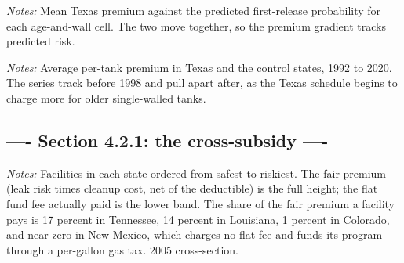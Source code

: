 \documentclass[
  12pt,
]{article}
\begin{document}
\clearpage
\null\vfill
\begin{center}
\label{fig-actuarial-alignment}
\par\vspace{8pt}
\par\vspace{8pt}
\begin{minipage}{0.85\textwidth}\small\textit{Notes:} Mean Texas premium against the predicted first-release probability for each age-and-wall cell. The two move together, so the premium gradient tracks predicted risk.\end{minipage}
\end{center}
\vfill\clearpage

\clearpage
\null\vfill
\begin{center}
\label{fig-premium-divergence}
\par\vspace{8pt}
\par\vspace{8pt}
\begin{minipage}{0.85\textwidth}\small\textit{Notes:} Average per-tank premium in Texas and the control states, 1992 to 2020. The series track before 1998 and pull apart after, as the Texas schedule begins to charge more for older single-walled tanks.\end{minipage}
\end{center}
\vfill\clearpage

\subsection{---- Section 4.2.1: the cross-subsidy
----}\label{section-4.2.1-the-cross-subsidy--}

\clearpage
\null\vfill
\begin{center}
\label{fig-cross-paid}
\par\vspace{8pt}
\par\vspace{8pt}
\begin{minipage}{0.85\textwidth}\small\textit{Notes:} Facilities in each state ordered from safest to riskiest. The fair premium (leak risk times cleanup cost, net of the deductible) is the full height; the flat fund fee actually paid is the lower band. The share of the fair premium a facility pays is 17 percent in Tennessee, 14 percent in Louisiana, 1 percent in Colorado, and near zero in New Mexico, which charges no flat fee and funds its program through a per-gallon gas tax. 2005 cross-section.\end{minipage}
\end{center}
\vfill\clearpage
\end{document}
